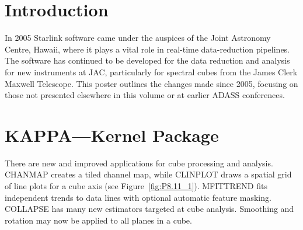 \documentclass[11pt,twoside]{article}  %
\begin{document}
%
%

\section{Introduction}
In 2005 Starlink software came under the auspices of the Joint
Astronomy Centre, Hawaii, where it plays a vital role in real-time
data-reduction pipelines.  The software has continued to be developed
for the data reduction and analysis for new instruments at JAC,
particularly for spectral cubes from the James Clerk Maxwell
Telescope.  This poster outlines the changes made since 2005, 
focusing on those not presented elsewhere in this volume or at 
earlier ADASS conferences. 

\section{KAPPA---Kernel Package}

There are new and improved applications for cube processing and
analysis.  {\footnotesize CHANMAP} creates a tiled channel map, while
{\footnotesize CLINPLOT} draws a spatial grid of line plots for a cube
axis (see Figure~\ref{fig:P8.11_1}).  {\footnotesize MFITTREND} fits
independent trends to data lines with optional automatic feature
masking.  {\footnotesize COLLAPSE} has many new estimators targeted at
cube analysis. Smoothing and rotation may now be applied to all planes
in a cube.
\end{document}
